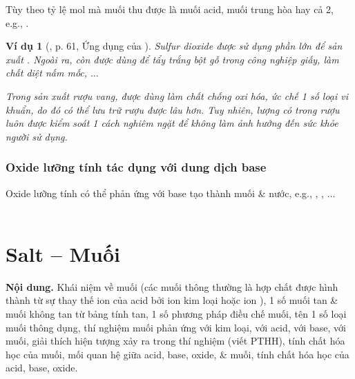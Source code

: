 \documentclass{article}
\newtheorem{vidu}{Ví dụ}
\begin{document}
Tùy theo tỷ lệ mol mà muối thu được là muối acid, muối trung hòa hay cả 2, e.g., .

\begin{vidu}[\cite{SGK_KHTN_8_Canh_Dieu}, p. 61, Ứng dụng của ]
	Sulfur dioxide {\rm{}} được sử dụng phần lớn để sản xuất {\rm{}}. Ngoài ra, {\rm{}} còn được dùng để tẩy trắng bột gỗ trong công nghiệp giấy, làm chất diệt nấm mốc, $\ldots$
	
	Trong sản xuất rượu vang, {\rm{}} được dùng làm chất chống oxi hóa, ức chế 1 số loại vi khuẩn, do đó có thể lưu trữ rượu được lâu hơn. Tuy nhiên, lượng {\rm{}} có trong rượu luôn được kiểm soát 1 cách nghiêm ngặt để không làm ảnh hưởng đến sức khỏe người sử dụng.
\end{vidu}

\subsubsection{Oxide lưỡng tính tác dụng với dung dịch base}
Oxide lưỡng tính có thể phản ứng với base tạo thành muối \& nước, e.g., , , $\ldots$\\
\\
\noindent{}


\section{Salt -- Muối}
\textsf{\textbf{Nội dung.} Khái niệm về muối (các muối thông thường là hợp chất được hình thành từ sự thay thế ion  của acid bởi ion kim loại hoặc ion ), 1 số muối tan \& muối không tan từ bảng tính tan, 1 số phương pháp điều chế muối, tên 1 số loại muối thông dụng, thí nghiệm muối phản ứng với kim loại, với acid, với base, với muối, giải thích hiện tượng xảy ra trong thí nghiệm (viết PTHH), tính chất hóa học của muối, mối quan hệ giữa acid, base, oxide, \& muối, tính chất hóa học của acid, base, oxide.}
\end{document}
